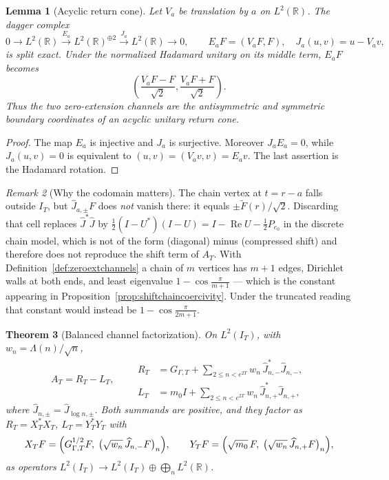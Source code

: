 \documentclass[11pt]{amsart}
\newtheorem{theorem}{Theorem}[section]
\newtheorem{lemma}[theorem]{Lemma}
\theoremstyle{definition}
\theoremstyle{remark}
\newtheorem{remark}[theorem]{Remark}
\newcommand{\R}{\mathbb R}
\begin{document}
\begin{lemma}[Acyclic return cone]\label{lem:acyclicreturncone}
Let $V_a$ be translation by $a$ on $L^2(\mathbb R)$.  The dagger
complex
\[
 0\longrightarrow L^2(\mathbb R)
 \xrightarrow{E_a}L^2(\mathbb R)^{\oplus2}
 \xrightarrow{J_a}L^2(\mathbb R)\longrightarrow0,
 \qquad
 E_aF=(V_aF,F),\quad J_a(u,v)=u-V_av,
\]
is split exact.  Under the normalized Hadamard unitary on its middle term,
$E_aF$ becomes
\[
 \left(\frac{V_aF-F}{\sqrt2},
       \frac{V_aF+F}{\sqrt2}\right).
\]
Thus the two zero-extension channels are the antisymmetric and symmetric
boundary coordinates of an acyclic unitary return cone.
\end{lemma}

\begin{proof}
The map $E_a$ is injective and $J_a$ is surjective.  Moreover
$J_aE_a=0$, while $J_a(u,v)=0$ is equivalent to
$(u,v)=(V_av,v)=E_av$.  The last assertion is the Hadamard rotation.
\end{proof}

\begin{remark}[Why the codomain matters]\label{rem:codomainmatters}
The chain vertex at \(t=r-a\) falls outside \(I_T\), but
\(\widehat J_{a,\pm}F\) does \emph{not} vanish there: it equals
\(\pm\widetilde F(r)/\sqrt2\).  Discarding that cell replaces
\(\widehat J^*\widehat J\) by
\(\tfrac12(I-U^*)(I-U)=I-\operatorname{Re}U-\tfrac12P_{e_0}\) in the discrete
chain model, which is not of the form (diagonal) minus
(compressed shift) and therefore does not reproduce the shift term of
\(A_T\).  With Definition~\ref{def:zeroextchannels} a chain of \(m\) vertices
has \(m+1\) edges, Dirichlet walls at both ends, and least eigenvalue
\(1-\cos\frac{\pi}{m+1}\) --- which is the constant appearing in
Proposition~\ref{prop:shiftchaincoercivity}.  Under the truncated reading that
constant would instead be \(1-\cos\frac{\pi}{2m+1}\).
\end{remark}

\begin{theorem}[Balanced channel factorization]\label{thm:balancedfactorization}
On \(L^2(I_T)\), with \(w_n=\Lambda(n)/\sqrt n\),
\begin{equation}\label{eq:balancedfactorization}
 A_T=R_T-L_T,
 \qquad
 \begin{aligned}
 R_T&=G_{\Gamma,T}+\sum_{2\le n<e^{2T}}w_n\,
      \widehat J_{n,-}^*\widehat J_{n,-},\\
 L_T&=m_0I+\sum_{2\le n<e^{2T}}w_n\,
      \widehat J_{n,+}^*\widehat J_{n,+},
 \end{aligned}
\end{equation}
where \(\widehat J_{n,\pm}=\widehat J_{\log n,\pm}\).  Both summands are
positive, and they factor as \(R_T=X_T^*X_T\), \(L_T=Y_T^*Y_T\) with
\begin{equation}\label{eq:referenceloadcolumns}
 X_TF=\Bigl(G_{\Gamma,T}^{1/2}F,\;
      \bigl(\sqrt{w_n}\,\widehat J_{n,-}F\bigr)_n\Bigr),
 \qquad
 Y_TF=\Bigl(\sqrt{m_0}\,F,\;
      \bigl(\sqrt{w_n}\,\widehat J_{n,+}F\bigr)_n\Bigr),
\end{equation}
as operators \(L^2(I_T)\to L^2(I_T)\oplus\bigoplus_nL^2(\R)\).
\end{theorem}
\end{document}
